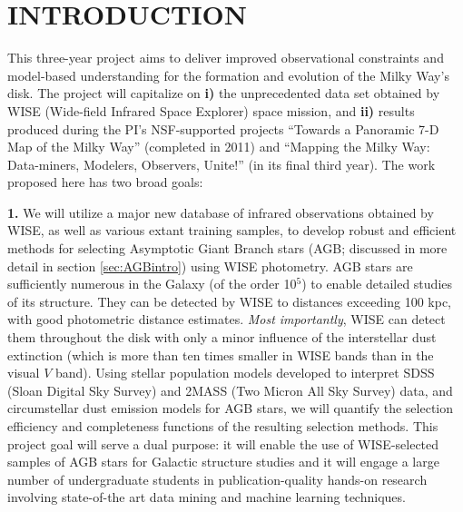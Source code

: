 \section{{\bf  INTRODUCTION}}

This three-year project aims to deliver improved observational constraints 
and model-based understanding for the formation and evolution of the 
Milky Way's disk. The project will capitalize on {\bf i)} the unprecedented data 
set obtained by WISE (Wide-field Infrared Space Explorer) space mission, and 
{\bf ii)} results produced during the PI's NSF-supported projects ``Towards a 
Panoramic 7-D Map of the Milky Way'' (completed in 2011) and ``Mapping the 
Milky Way: Data-miners, Modelers, Observers, Unite!'' (in its final third year). 
The work proposed here has two broad goals:

{\bf 1.} We will utilize a major new database of infrared observations obtained by
WISE, as well as various extant training samples, to develop robust and efficient methods for 
selecting Asymptotic Giant Branch stars (AGB; discussed in more detail in section 
\ref{sec:AGBintro}) using WISE photometry. AGB stars
are sufficiently numerous in the Galaxy (of the order 10$^5$) to enable detailed
studies of its structure. They can be detected by WISE to distances exceeding 100 kpc,
with good photometric distance estimates.
{\it Most importantly}, WISE can detect them throughout the
disk with only a minor influence of the interstellar dust extinction (which is
more than ten times smaller in WISE bands than in the visual $V$ band). 
Using stellar population models developed to interpret SDSS (Sloan Digital Sky Survey)
and 2MASS (Two Micron All Sky Survey) data, 
and circumstellar dust emission models for AGB stars, we will quantify the selection
efficiency and completeness functions of the resulting selection methods. This project 
goal will serve a dual purpose: it will enable the use of WISE-selected samples 
of AGB stars for Galactic structure studies and 
it will engage a large number of undergraduate students in publication-quality 
hands-on research involving state-of-the art data mining and machine learning techniques. 

